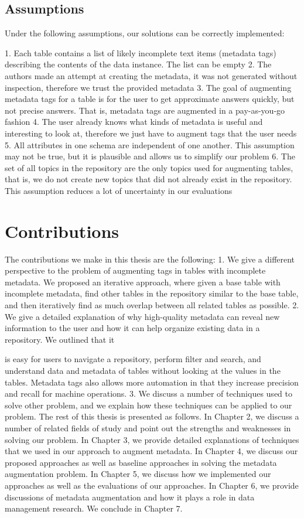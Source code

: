 \subsection{Assumptions}
Under the following assumptions, our solutions can be correctly implemented:

1. Each table contains a list of likely incomplete text items (metadata tags) describing the contents of the data instance. The list can be empty
2. The authors made an attempt at creating the metadata, it was not generated without inspection, therefore we trust the provided metadata
3. The goal of augmenting metadata tags for a table is for the user to get approximate answers quickly, but not precise answers. That is, metadata tags are augmented in a pay-as-you-go fashion
4. The user already knows what kinds of metadata is useful and interesting to look at, therefore we just have to augment tags that the user needs
5. All attributes in one schema are independent of one another. This assumption may not be true, but it is plausible and allows us to simplify our problem
6. The set of all topics in the repository are the only topics used for augmenting tables, that is, we do not create new topics that did not already exist in the repository. This assumption reduces a lot of uncertainty in our evaluations

\section{Contributions}
\label{sec:Contributions}
The contributions we make in this thesis are the following:
1. We give a different perspective to the problem of augmenting tags in tables with incomplete metadata. We proposed an iterative approach, where given a base table with incomplete metadata, find other tables in the repository similar to the base table, and then iteratively find as much overlap between all related tables as possible.
2. We give a detailed explanation of why high-quality metadata can reveal new information to the user and how it can help organize existing data in a repository. We outlined that it

is easy for users to navigate a repository, perform filter and search, and understand data and metadata of tables without looking at the values in the tables. Metadata tags also allows more automation in that they increase precision and recall for machine operations.
3. We discuss a number of techniques used to solve other problem, and we explain how these techniques can be applied to our problem.
The rest of this thesis is presented as follows. In Chapter 2, we discuss a number of related fields of study and point out the strengths and weaknesses in solving our problem. In Chapter 3, we provide detailed explanations of techniques that we used in our approach to augment metadata. In Chapter 4, we discuss our proposed approaches as well as baseline approaches in solving the metadata augmentation problem. In Chapter 5, we discuss how we implemented our approaches as well as the evaluations of our approaches. In Chapter 6, we provide discussions of metadata augmentation and how it plays a role in data management research. We conclude in Chapter 7.
